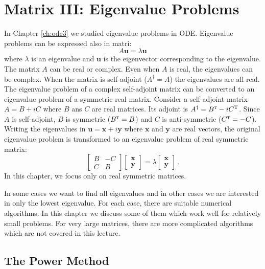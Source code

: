 \chapter{Matrix III: Eigenvalue Problems}\label{ch:matrix3}

In Chapter \ref{ch:ode3} we studied eigenvalue problems in ODE. Eigenvalue problems can be expressed  also in matri: 
\begin{equation}\label{eq:general_eigen}
   A \mathbf{u} = \lambda \mathbf{u}
\end{equation}
where $\lambda$ is an eigenvalue and $\mathbf{u}$ is the eigenvector corresponding to the eigenvalue. 
The matrix $A$ can be real or complex.  Even when $A$ is real, the eigenvalues can be complex.   When the matrix is self-adjoint ($A^\dagger=A$) the eigenvalues are all real.   The eigenvalue problem of a complex self-adjoint matrix can be converted to an eigenvalue problem of a symmetric real matrix.  Consider a self-adjoint matrix $A = B + iC$ where $B$ ans $C$ are real matrices.
Its adjoint is $A^\dagger = B^\textsc{t} - i C^\textsc{T}$.   Since $A$ is self-adjoint, $B$ is symmetric ($B^\textsc{t}=B$) and $C$ is anti-symmetric ($C^\textsc{t}=-C$).  Writing the eigenvalues in $\mathbf{u}=\mathbf{x}+i \mathbf{y}$ where $\mathbf{x}$ and $\mathbf{y}$ are real vectors, the original eigenvalue problem is transformed to an eigenvalue problem of real symmetric matrix:
\begin{equation}\label{eq:complex_eqigen}
\begin{bmatrix} B & -C \\ C & B \end{bmatrix} 
\begin{bmatrix} \mathbf{x} \\ \mathbf{y} \end{bmatrix}
= \lambda
\begin{bmatrix} \mathbf{x} \\ \mathbf{y} \end{bmatrix}\,.
\end{equation}
In this chapter, we focus only on real symmetric  matrices.

In some cases we want to find all eigenvalues and in other cases we are interested in only the lowest eigenvalue. For each case, there are suitable numerical algorithms.  In this chapter we discuss some of them which work well for relatively small problems.  For very large matrices, there are more complicated algorithms which are not covered in this lecture.

\section{The Power Method}

